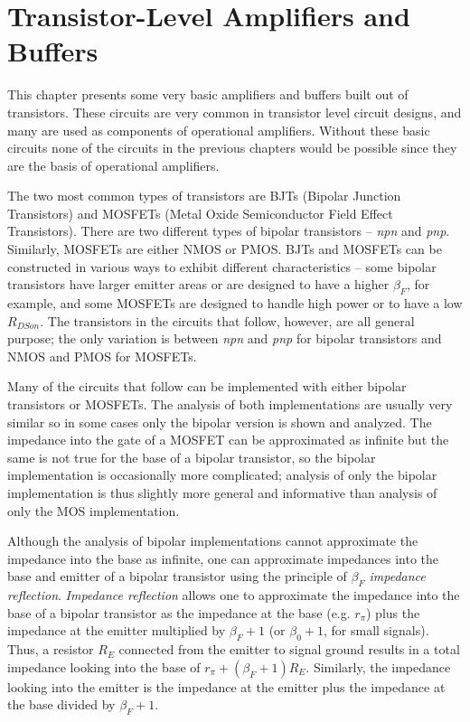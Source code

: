 \chapter{Transistor-Level Amplifiers and Buffers}
This chapter presents some very basic amplifiers and buffers built out of transistors. These circuits are very common in transistor level circuit designs, and many are used as components of operational amplifiers. Without these basic circuits none of the circuits in the previous chapters would be possible since they are the basis of operational amplifiers.
\par
The two most common types of transistors are BJTs (Bipolar Junction Transistors) and MOSFETs (Metal Oxide Semiconductor Field Effect Transistors). There are two different types of bipolar transistors -- \textit{npn} and \textit{pnp}. Similarly, MOSFETs are either NMOS or PMOS. BJTs and MOSFETs can be constructed in various ways to exhibit different characteristics -- some bipolar transistors have larger emitter areas or are designed to have a higher $\beta_{F}$, for example, and some MOSFETs are designed to handle high power or to have a low $R_{DSon}$. The transistors in the circuits that follow, however, are all general purpose; the only variation is between \textit{npn} and \textit{pnp} for bipolar transistors and NMOS and PMOS for MOSFETs.
\par
Many of the circuits that follow can be implemented with either bipolar transistors or MOSFETs. The analysis of both implementations are usually very similar so in some cases only the bipolar version is shown and analyzed. The impedance into the gate of a MOSFET can be approximated as infinite but the same is not true for the base of a bipolar transistor, so the bipolar implementation is occasionally more complicated; analysis of only the bipolar implementation is thus slightly more general and informative than analysis of only the MOS implementation.
\par
Although the analysis of bipolar implementations cannot approximate the impedance into the base as infinite, one can approximate impedances into the base and emitter of a bipolar transistor using the principle of \textit{$\beta_{F}$ impedance reflection}. \textit{Impedance reflection} allows one to approximate the impedance into the base of a bipolar transistor as the impedance at the base (e.g. $r_{\pi}$) plus the impedance at the emitter multiplied by $\beta_{F} + 1$ (or $\beta_{0} + 1$, for small signals). Thus, a resistor $R_{E}$ connected from the emitter to signal ground results in a total impedance looking into the base of $r_{\pi} + (\beta_{F} + 1)R_{E}$. Similarly, the impedance looking into the emitter is the impedance at the emitter plus the impedance at the base divided by $\beta_{F} + 1$.
